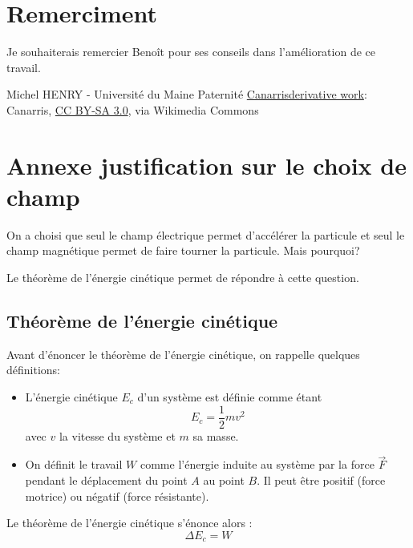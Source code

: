 \documentclass[14pt]{article}
\begin{document}
\section*{Remerciment}

Je souhaiterais remercier Benoît pour ses conseils dans l'amélioration de ce travail.

\begin{thebibliography}{9}
Michel HENRY - Université du Maine Paternité
\href{https://commons.wikimedia.org/wiki/File:Rechte-Hand-Regel.svg}{Canarrisderivative work}: Canarris, \href{https://creativecommons.org/licenses/by-sa/3.0}{CC BY-SA 3.0}, via Wikimedia Commons
\end{thebibliography}

\section{Annexe justification sur le choix de champ}

On a choisi que seul le champ électrique permet d'accélérer la particule et seul le champ magnétique permet de faire tourner la particule. Mais pourquoi?

Le théorème de l'énergie cinétique permet de répondre à cette question.

\subsection{Théorème de l'énergie cinétique}\label{theoEC}

Avant d'énoncer le théorème de l'énergie cinétique, on rappelle quelques définitions:
\begin{itemize}
    \item L'énergie cinétique $E_c$ d'un système est définie comme étant
    \begin{equation} \label{eq:3.1.1}
        E_c = \frac{1}{2} m v^2
        \tag{3.1.1}
    \end{equation}
    avec $v$ la vitesse du système et $m$ sa masse.
    \item On définit le travail $W$ comme l'énergie induite au système par la force $\vec{F}$ pendant le déplacement du point $A$ au point $B$.
    Il peut être positif (force motrice) ou négatif (force résistante).
\end{itemize}

\hspace{1mm}

Le théorème de l'énergie cinétique s'énonce alors :
\begin{equation} \label{eq:3.1.2}
    \Delta E_c = W
    \tag{3.1.2}
\end{equation}
\end{document}
